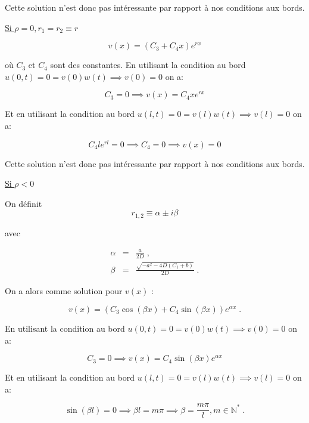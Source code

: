 \documentclass[a4paper, 12pt]{report}
\begin{document}
Cette solution n'est donc pas intéressante par rapport à nos conditions aux bords.

\underline{Si $\rho = 0, r_1 = r_2 \equiv r$}

\begin{equation}
  v(x) = (C_3 + C_4 x) e^{r x}
\end{equation}

où $C_3$ et $C_4$ sont des constantes. En utilisant la condition au bord
$u(0,t) = 0 = v(0) w(t) \implies v(0) = 0$ on a:

\begin{equation}
  C_3 = 0 \implies   v(x) = C_4 x e^{r x}
\end{equation}

Et en utilisant la condition au bord $u(l,t) = 0 = v(l) w(t) \implies v(l) = 0$ on a:

\begin{equation}
  C_4 l e^{r l} = 0 \implies C_4 = 0 \implies v(x) = 0
\end{equation}

Cette solution n'est donc pas intéressante par rapport à nos conditions aux bords.

\underline{Si $\rho < 0$}

On définit
\begin{equation}
r_{1,2} \equiv \alpha \pm i \beta
\end{equation}

avec

\begin{eqnarray}
  \alpha & = & \frac{a}{2 D}\;,\\
  \beta & = & \frac{\sqrt{-a^{2} - 4 D (C_{1} + b)}}{2 D}\;.\label{beta}
\end{eqnarray}

On a alors comme solution pour $v(x)$ :

\begin{equation}
  v(x) = (C_3 \cos(\beta x) + C_4 \sin(\beta x)) e^{\alpha x}\;.
\end{equation}

En utilisant la condition au bord $u(0,t) = 0 = v(0) w(t) \implies v(0) = 0$ on a:

\begin{equation}
  C_3 = 0 \implies v(x) = C_4 \sin(\beta x) e^{\alpha x}
\end{equation}

Et en utilisant la condition au bord $u(l,t) = 0 = v(l) w(t) \implies v(l) = 0$ on a:

\begin{equation}
  \sin(\beta l) = 0 \implies \beta l = m \pi \implies \beta = \frac{m \pi}{l}, m \in \mathbb{N}^{\ast}\;.
\end{equation}
\end{document}
